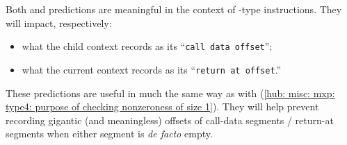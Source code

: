 \saNote{} \label{hub: misc: mxp: type5: purpose of checking nonzeroness of size 1 and size 2}
Both
\miscMxpSizeOneNonzeroNoMxpx{} and
\miscMxpSizeTwoNonzeroNoMxpx{} predictions
are meaningful in the context of -type instructions.
They will impact, respectively:
\begin{itemize}
	\item what the child   context records as its ``\texttt{call data offset}'';
	\item what the current context records as its ``\texttt{return at offset}.''
\end{itemize}
These predictions are useful in much the same way as with (\ref{hub: misc: mxp: type4: purpose of checking nonzeroness of size 1}).
They will help prevent recording gigantic (and meaningless) offsets of call-data segments / return-at segments when either segment is \emph{de facto} empty.
